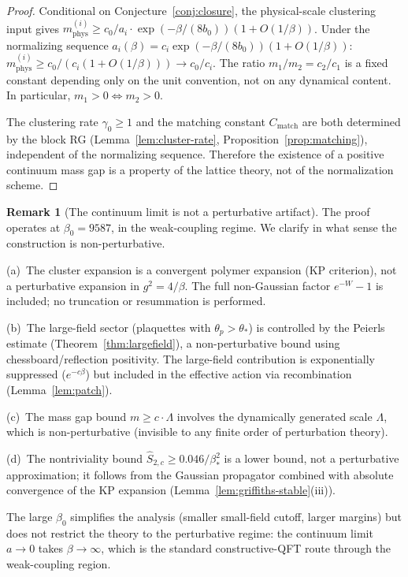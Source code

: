\documentclass[11pt]{article}
\theoremstyle{definition}
\newtheorem{remark}[theorem]{Remark}
\begin{document}
\begin{proof}
Conditional on Conjecture~\ref{conj:closure}, the physical-scale clustering input gives $m_{\mathrm{phys}}^{(i)}\ge c_0/a_i\cdot\exp(-\beta/(8b_0))(1+O(1/\beta))$.  Under the normalizing sequence $a_i(\beta)=c_i\exp(-\beta/(8b_0))(1+O(1/\beta))$:
$m_{\mathrm{phys}}^{(i)}\ge c_0/(c_i(1+O(1/\beta)))\to c_0/c_i$.
The ratio
$m_1/m_2=c_2/c_1$
is a fixed constant depending only on the unit convention,
not on any dynamical content.  In particular,
$m_1>0\iff m_2>0$.

The clustering rate $\gamma_0\ge 1$ and the matching constant
$C_{\mathrm{match}}$ are both determined by the block RG
(Lemma~\ref{lem:cluster-rate},
Proposition~\ref{prop:matching}), independent of the
normalizing sequence.  Therefore the existence of a positive
continuum mass gap is a property of the lattice theory,
not of the normalization scheme.
\end{proof}

\begin{remark}[The continuum limit is not a perturbative artifact]%
\label{rem:not-perturbative}
The proof operates at $\beta_0=9587$, in the weak-coupling
regime.  We clarify in what sense the construction is
non-perturbative.

(a)~The cluster expansion is a convergent polymer expansion
(KP criterion), not a perturbative expansion
in $g^2=4/\beta$.  The full non-Gaussian factor $e^{-W}-1$ is
included; no truncation or resummation is performed.

(b)~The large-field sector (plaquettes with $\theta_p>\theta_*$)
is controlled by the Peierls estimate
(Theorem~\ref{thm:largefield}), a
non-perturbative bound using chessboard/reflection positivity.
The large-field contribution is exponentially suppressed
($e^{-c\beta}$) but included in the effective action
via recombination (Lemma~\ref{lem:patch}).

(c)~The mass gap bound $m\ge c\cdot\Lambda$ involves the
dynamically generated scale $\Lambda$, which is
non-perturbative (invisible to any
finite order of perturbation theory).

(d)~The nontriviality bound $\hat S_{2,c}\ge 0.046/\beta_*^2$
is a lower bound,
not a perturbative approximation; it follows from the Gaussian
propagator combined with absolute convergence of the KP
expansion (Lemma~\ref{lem:griffiths-stable}(iii)).

The large $\beta_0$ simplifies the
analysis (smaller small-field cutoff, larger
margins) but does not restrict the theory to the
perturbative regime: the continuum limit $a\to 0$ takes
$\beta\to\infty$, which is the standard constructive-QFT
route through the weak-coupling region.
\end{remark}
\end{document}
